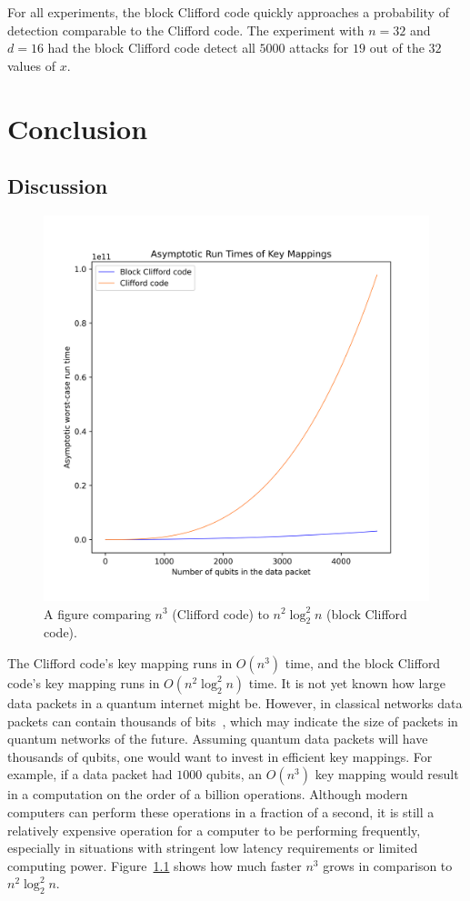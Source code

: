 For all experiments, the block Clifford code quickly approaches a probability of detection comparable to the Clifford code. The experiment with $n = 32$ and $d = 16$ had the block Clifford code detect all $5000$ attacks for $19$ out of the $32$ values of $x$.

\chapter{Conclusion}
\label{sec:Conclusion}
\section{Discussion}
\label{sec:Discussion}
\begin{figure}
    \centering
    \includegraphics[scale=0.6]{Figures/keymapping_runtimes.png}
    \caption{A figure comparing $n^3$ (Clifford code) to $n^2 \log_2^2n$ (block Clifford code).}
    \label{fig:keyMappingRunTimesComparison}
\end{figure}

The Clifford code's key mapping runs in $O\left(n^3\right)$ time, and the block Clifford code's key mapping runs in $O\left(n^2 \log_2^2 n\right)$ time. It is not yet known how large data packets in a quantum internet might be. However, in classical networks data packets can contain thousands of bits~\cite{rfc879}, which may indicate the size of packets in quantum networks of the future. Assuming quantum data packets will have thousands of qubits, one would want to invest in efficient key mappings. For example, if a data packet had $1000$ qubits, an $O\left(n^3\right)$ key mapping would result in a computation on the order of a billion operations. Although modern computers can perform these operations in a fraction of a second, it is still a relatively expensive operation for a computer to be performing frequently, especially in situations with stringent low latency requirements or limited computing power. Figure~\ref{fig:keyMappingRunTimesComparison} shows how much faster $n^3$ grows in comparison to $n^2 \log_2^2n$.

